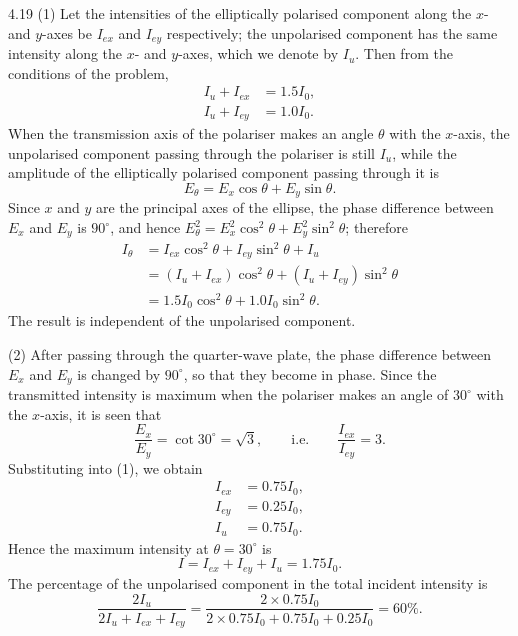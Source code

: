 \begin{solution}{4.19}
(1) Let the intensities of the elliptically polarised component along the $x$- and $y$-axes be
$I_{ex}$ and $I_{ey}$ respectively; the unpolarised component has the same intensity along the
$x$- and $y$-axes, which we denote by $I_u$. Then from the conditions of the problem,
\begin{align}
I_u + I_{ex} &= 1.5I_0, \tag{1}\\
I_u + I_{ey} &= 1.0I_0. \tag{2}
\end{align}
When the transmission axis of the polariser makes an angle $\theta$ with the $x$-axis, the
unpolarised component passing through the polariser is still $I_u$, while the amplitude of the
elliptically polarised component passing through it is
\begin{equation*}
E_\theta = E_x\cos\theta + E_y\sin\theta .
\end{equation*}
Since $x$ and $y$ are the principal axes of the ellipse, the phase difference between $E_x$ and
$E_y$ is $90^\circ$, and hence
$E_\theta^2 = E_x^2\cos^2\theta + E_y^2\sin^2\theta$; therefore
\begin{align*}
I_\theta &= I_{ex}\cos^2\theta + I_{ey}\sin^2\theta + I_u\\
          &= (I_u+I_{ex})\cos^2\theta + (I_u+I_{ey})\sin^2\theta\\
          &= 1.5I_0\cos^2\theta + 1.0I_0\sin^2\theta .
\end{align*}
The result is independent of the unpolarised component.

(2) After passing through the quarter-wave plate, the phase difference between $E_x$ and $E_y$ is
changed by $90^\circ$, so that they become in phase. Since the transmitted intensity is maximum
when the polariser makes an angle of $30^\circ$ with the $x$-axis, it is seen that
\begin{equation*}
\frac{E_x}{E_y} = \cot 30^\circ = \sqrt{3},
\qquad\text{i.e.}\qquad
\frac{I_{ex}}{I_{ey}} = 3 .
\end{equation*}
Substituting into (1), we obtain
\begin{align*}
I_{ex} &= 0.75I_0,\\
I_{ey} &= 0.25I_0,\\
I_u &= 0.75I_0 .
\end{align*}
Hence the maximum intensity at $\theta = 30^\circ$ is
\begin{equation*}
I = I_{ex}+I_{ey}+I_u = 1.75I_0 .
\end{equation*}
The percentage of the unpolarised component in the total incident intensity is
\begin{equation*}
\frac{2I_u}{2I_u+I_{ex}+I_{ey}}
= \frac{2\times 0.75I_0}{2\times 0.75I_0+0.75I_0+0.25I_0} = 60\% .
\end{equation*}
\end{solution}

